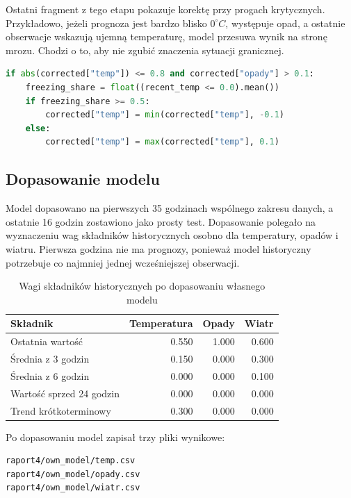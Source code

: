 \documentclass[a4paper,12pt]{article}
\begin{document}
\noindent
Ostatni fragment z tego etapu pokazuje korektę przy progach krytycznych.
Przykładowo, jeżeli prognoza jest bardzo blisko \(0^\circ C\), występuje opad,
a ostatnie obserwacje wskazują ujemną temperaturę, model przesuwa wynik na
stronę mrozu. Chodzi o to, aby nie zgubić znaczenia sytuacji granicznej.

\begin{lstlisting}[language=Python]
if abs(corrected["temp"]) <= 0.8 and corrected["opady"] > 0.1:
    freezing_share = float((recent_temp <= 0.0).mean())
    if freezing_share >= 0.5:
        corrected["temp"] = min(corrected["temp"], -0.1)
    else:
        corrected["temp"] = max(corrected["temp"], 0.1)
\end{lstlisting}

\subsection{Dopasowanie modelu}

Model dopasowano na pierwszych 35 godzinach wspólnego zakresu danych, a
ostatnie 16 godzin zostawiono jako prosty test. Dopasowanie polegało na
wyznaczeniu wag składników historycznych osobno dla temperatury, opadów i
wiatru. Pierwsza godzina nie ma prognozy, ponieważ model historyczny potrzebuje
co najmniej jednej wcześniejszej obserwacji.

\begin{table}[h]
\centering
\caption{Wagi składników historycznych po dopasowaniu własnego modelu}
\begin{tabular}{lrrr}
\toprule
Składnik & Temperatura & Opady & Wiatr \\
\midrule
Ostatnia wartość & 0.550 & 1.000 & 0.600 \\
Średnia z 3 godzin & 0.150 & 0.000 & 0.300 \\
Średnia z 6 godzin & 0.000 & 0.000 & 0.100 \\
Wartość sprzed 24 godzin & 0.000 & 0.000 & 0.000 \\
Trend krótkoterminowy & 0.300 & 0.000 & 0.000 \\
\bottomrule
\end{tabular}
\end{table}

\noindent
Po dopasowaniu model zapisał trzy pliki wynikowe:
\begin{verbatim}
raport4/own_model/temp.csv
raport4/own_model/opady.csv
raport4/own_model/wiatr.csv
\end{verbatim}
\end{document}
